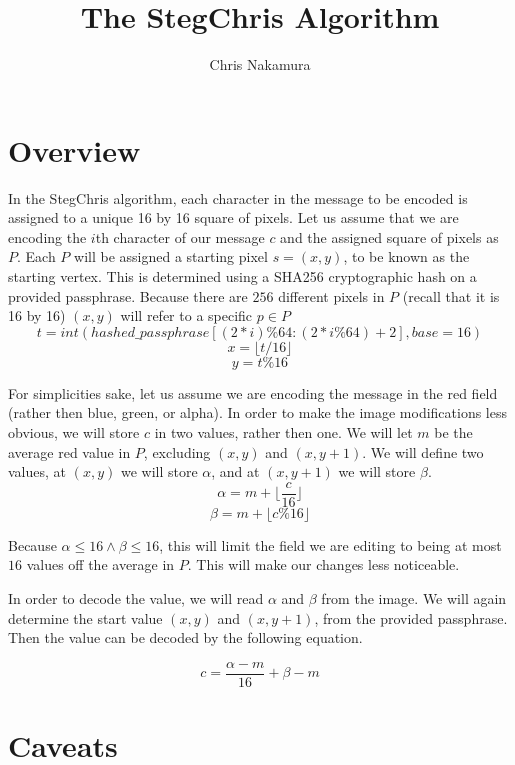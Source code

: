 \documentclass{article}
\title{The StegChris Algorithm}
\author{Chris Nakamura}
\begin{document}
\maketitle

\section{Overview}

In the StegChris algorithm, each character in the message to be encoded is assigned to a unique 16 by 16 square of pixels. Let us assume that we are encoding the $i$th character of our message $c$ and the assigned square of pixels as $P$. Each $P$ will be assigned a starting pixel $s=(x,y)$, to be known as the starting vertex.  This is determined using a SHA256 cryptographic hash on a provided passphrase. Because there are $256$ different pixels in $P$ (recall that it is 16 by 16) $(x,y)$ will refer to a specific $p \in P$
$$t = int(hashed\_passphrase[(2*i)\%64:(2*i\%64)+2],base=16)$$
$$x = \lfloor t / 16 \rfloor$$
$$y = t \% 16$$

For simplicities sake, let us assume we are encoding the message in the red field (rather then blue, green, or alpha).  In order to make the image modifications less obvious, we will store $c$ in two values, rather then one. We will let $m$ be the average red value in $P$, excluding $(x,y)$ and $(x,y+1)$. We will define two values, at $(x,y)$ we will store $\alpha$, and at $(x,y+1)$ we will store $\beta$. 
$$\alpha = m + \lfloor \frac{c}{16}\rfloor $$
$$\beta = m + \lfloor c \% 16\rfloor$$

Because $\alpha \leq 16 \land \beta \leq 16$, this will limit the field we are editing to being at most $16$ values off the average in $P$.  This will make our changes less noticeable.

In order to decode the value, we will read $\alpha$ and $\beta$ from the image. We will again determine the start value $(x,y)$ and $(x,y+1)$, from the provided passphrase. Then the value can be decoded by the following equation.

$$c = \frac{\alpha-m}{16}+\beta-m$$

\section{Caveats}
\end{document}
